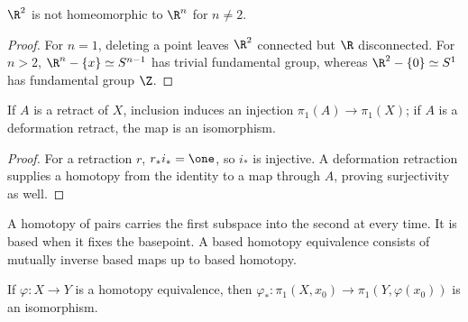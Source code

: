 \begin{corollary}
\label{cor:r2-not-homeomorphic-rn}



$\R^2$ is not homeomorphic to $\R^n$ for $n\ne2$.
\end{corollary}

\begin{proof}
\sketch For $n=1$, deleting a point leaves $\R^2$ connected but $\R$ disconnected.
For $n>2$, $\R^n-\{x\}\simeq S^{n-1}$ has trivial fundamental group,
whereas $\R^2-\{0\}\simeq S^1$ has fundamental group $\Z$.
\end{proof}

\begin{proposition}
\label{prop:retract-induces-injective-pi1}



If $A$ is a retract of $X$, inclusion induces an injection $\pi_1(A)\to\pi_1(X)$;
if $A$ is a deformation retract, the map is an isomorphism.
\end{proposition}

\begin{proof}
\sketch For a retraction $r$, $r_*i_*=\one$, so $i_*$ is injective. A deformation
retraction supplies a homotopy from the identity to a map through $A$, proving
surjectivity as well.
\end{proof}

\begin{definition}
\label{def:based-homotopy-equivalence}



A homotopy of pairs carries the first subspace into the second at every time.
It is based when it fixes the basepoint. A based homotopy equivalence consists
of mutually inverse based maps up to based homotopy.
\end{definition}

\begin{proposition}
\label{prop:homotopy-equivalence-induces-pi1-iso}



If $\varphi:X\to Y$ is a homotopy equivalence, then
$\varphi_*:\pi_1(X,x_0)\to\pi_1(Y,\varphi(x_0))$ is an isomorphism.
\end{proposition}

